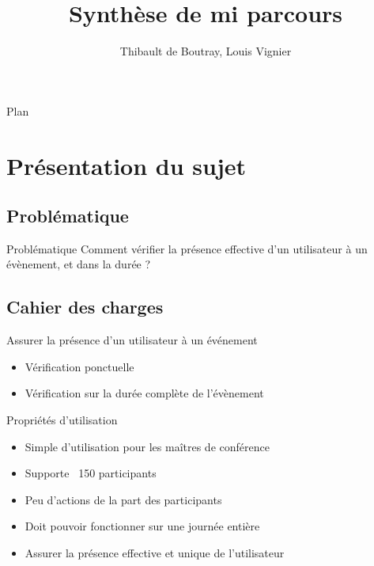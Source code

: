\documentclass{beamer}
\title{Synthèse de mi parcours}
\author{Thibault de Boutray, Louis Vignier}
\institute{CentraleSupélec}
\begin{document}
\begin{frame}
  \titlepage
\end{frame}

\begin{frame}{Plan}
  \tableofcontents
\end{frame}

\section{Présentation du sujet}

\begin{frame}
    
\end{frame}

\subsection{Problématique}

\begin{frame}{Problématique}
 Comment vérifier la présence effective d'un utilisateur à un évènement, et dans la durée ? 
\end{frame}


\subsection{Cahier des charges}

\begin{frame}{Assurer la présence d’un utilisateur à un événement}	
    \begin{itemize}
        \item Vérification ponctuelle\pause
        \item Vérification sur la durée complète de l'évènement
    \end{itemize}
\end{frame}

\begin{frame}{Propriétés d'utilisation}
    \begin{itemize}
        \item Simple d’utilisation pour les maîtres de conférence\pause
        \item Supporte ~150 participants\pause
        \item Peu d’actions de la part des participants\pause
        \item Doit pouvoir fonctionner sur une journée entière\pause
        \item Assurer la présence effective et unique de l’utilisateur
    \end{itemize}
\end{frame}
\end{document}
